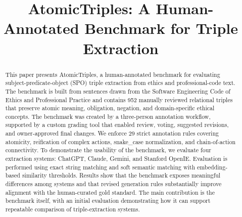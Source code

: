 \documentclass[conference]{IEEEtran}
\begin{document}
\title{AtomicTriples: A Human-Annotated Benchmark for Triple Extraction}

\author{
}

\maketitle

\begin{abstract}
This paper presents AtomicTriples, a human-annotated benchmark for evaluating subject-predicate-object (SPO) triple extraction from ethics and professional-code text. The benchmark is built from sentences drawn from the Software Engineering Code of Ethics and Professional Practice and contains 952 manually reviewed relational triples that preserve atomic meaning, obligation, negation, and domain-specific ethical concepts. The benchmark was created by a three-person annotation workflow, supported by a custom grading tool that enabled review, voting, suggested revisions, and owner-approved final changes. We enforce 29 strict annotation rules covering atomicity, reification of complex actions, snake\_case normalization, and chain-of-action connectivity. To demonstrate the usability of the benchmark, we evaluate four extraction systems: ChatGPT, Claude, Gemini, and Stanford OpenIE. Evaluation is performed using exact string matching and soft semantic matching with embedding-based similarity thresholds. Results show that the benchmark exposes meaningful differences among systems and that revised generation rules substantially improve alignment with the human-curated gold standard. The main contribution is the benchmark itself, with an initial evaluation demonstrating how it can support repeatable comparison of triple-extraction systems.
\end{abstract}
\end{document}
